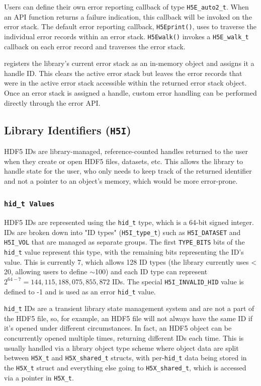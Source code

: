 \begin{itemize}
Users can define their own error reporting callback of type \texttt{H5E\_auto2\_t}. When an API function returns a failure indication, this callback will be invoked on the error stack. The default error reporting callback, \texttt{H5Eprint()}, uses  to traverse the individual error records within an error stack. \texttt{H5Ewalk()} invokes a \texttt{H5E\_walk\_t} callback on each error record and traverses the error stack.

 registers the library's current error stack as an in-memory object and assigns it a handle ID. This clears the active error stack but leaves the error records that were in the active error stack accessible within the returned error stack object. Once an error stack is assigned a handle, custom error handling can be performed directly through the error API.
\end{itemize}

\subsection{Library Identifiers (\texttt{H5I})}\label{ref:handles}

HDF5 IDs are library-managed, reference-counted handles returned to the user when they create or open HDF5 files, datasets, etc. This allows the library to handle state for the user, who only needs to keep track of the returned identifier and not a pointer to an object's memory, which would be more error-prone.

\subsubsection{\texttt{hid\_t Values}}

HDF5 IDs are represented using the \texttt{hid\_t} type, which is a 64-bit signed integer. IDs are broken down into "ID types" (\texttt{H5I\_type\_t}) such as \texttt{H5I\_DATASET} and \texttt{H5I\_VOL} that are managed as separate groups. The first \texttt{TYPE\_BITS} bits of the \texttt{hid\_t} value represent this type, with the remaining bits representing the ID's value. This is currently 7, which allows 128 ID types (the library currently uses < 20, allowing users to define $\sim$100) and each ID type can represent $2^{64-7} = 144,115,188,075,855,872$ IDs. The special \texttt{H5I\_INVALID\_HID} value is defined to -1 and is used as an error \texttt{hid\_t} value.

\texttt{hid\_t} IDs are a transient library state management system and are not a part of the HDF5 file, so, for example, an HDF5 file will not always have the same ID if it's opened under different circumstances. In fact, an HDF5 object can be concurrently opened multiple times, returning different IDs each time. This is usually handled via a library object type scheme where object data are split between \texttt{H5X\_t} and \texttt{H5X\_shared\_t} structs, with per-\texttt{hid\_t} data being stored in the \texttt{H5X\_t} struct and everything else going to \texttt{H5X\_shared\_t}, which is accessed via a pointer in \texttt{H5X\_t}.

